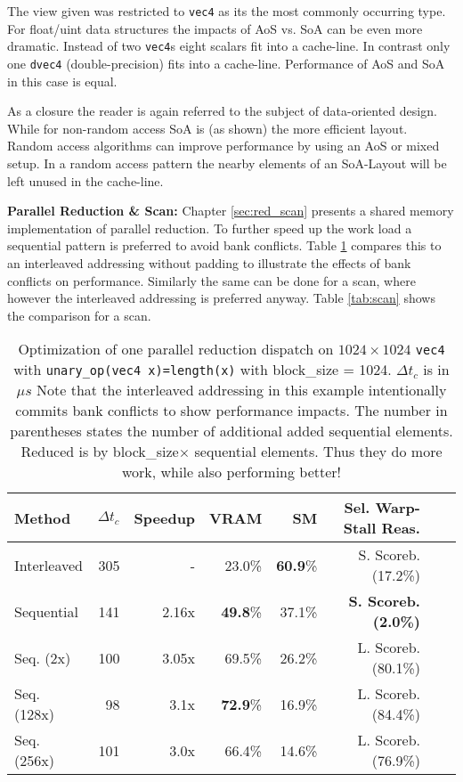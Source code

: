 \documentclass[m,times]{cgMA}
\begin{document}
The view given was restricted to \texttt{vec4} as its the most commonly occurring type. For float/uint data structures the impacts of AoS vs. SoA can be even more dramatic. Instead of two \texttt{vec4}s eight scalars fit into a cache-line. In contrast only one \texttt{dvec4} (double-precision) fits into a cache-line. Performance of AoS and SoA in this case is equal.

As a closure the reader is again referred to the subject of data-oriented design. While for non-random access SoA is (as shown) the more efficient layout. Random access algorithms can improve performance by using an AoS or mixed setup. In a random access pattern the nearby elements of an SoA-Layout will be left unused in the cache-line.

\textbf{Parallel Reduction \& Scan:} Chapter \ref{sec:red_scan} presents a shared memory implementation of parallel reduction. To further speed up the work load a sequential pattern is preferred to avoid bank conflicts. Table \ref{tab:map_reduce} compares this to an interleaved addressing without padding to illustrate the effects of bank conflicts on performance. Similarly the same can be done for a scan, where however the interleaved addressing is preferred anyway. Table \ref{tab:scan} shows the comparison for a scan.

\begin{table}[htpb]
  \begin{tabular}{ | l | r | r | r | r | r | r | r |}    \hline
    Method         &  $\Delta t_c$ & Speedup &VRAM              & SM              & Sel. Warp-Stall Reas.\\\hline
    Interleaved    & 305                   & -       &23.0\%          & \textbf{60.9}\%  & S. Scoreb.(17.2\%)\\\hline
    Sequential     & 141                   & 2.16x   &\textbf{49.8}\%   & 37.1\%         & \textbf{S. Scoreb.(2.0\%)} \\\hline
    Seq. (2x)      & 100                   & 3.05x   &69.5\%            & 26.2\%         & L. Scoreb.(80.1\%)\\\hline
    Seq. (128x)    & 98                    & 3.1x    &\textbf{72.9}\%   & 16.9\%         & L. Scoreb.(84.4\%)\\\hline
    Seq. (256x)    & 101                   & 3.0x    &66.4\%            & 14.6\%         & L. Scoreb.(76.9\%)\\
    \hline
  \end{tabular}
  \caption{Optimization of one parallel reduction dispatch on $1024\times1024$ \texttt{vec4} with \texttt{unary\_op(vec4 x)=length(x)} with block\_size = 1024. $\Delta t_c$ is in $\mu s$ Note that the interleaved addressing in this example intentionally commits bank conflicts to show performance impacts. The number in parentheses states the number of additional added sequential elements. Reduced is by block\_size$\times$ sequential elements. Thus they do more work, while also performing better!}\label{tab:map_reduce}
\end{table}
\end{document}
